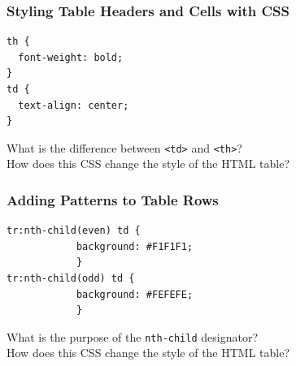 \documentclass[14pt,aspectratio=169]{beamer}
\begin{document}
%
\begin{frame}[fragile]
  \frametitle{Styling Table Headers and Cells with CSS}
  \normalsize
  \hspace*{.25in}
  \begin{minipage}{6in}
    \vspace*{.2in}
    \begin{verbatim}
th {
  font-weight: bold;
}
td {
  text-align: center;
}
    \end{verbatim}
  \end{minipage}
  \vspace*{.05in}
  \begin{center}
    \noindent What is the difference between {\tt <td>} and {\tt <th>}?\\
    \noindent How does this CSS change the style of the HTML table?\\
  \end{center}
\end{frame}

%
\begin{frame}[fragile]
  \frametitle{Adding Patterns to Table Rows}
  \normalsize
  \hspace*{.25in}
  \begin{minipage}{6in}
    \vspace*{.2in}
    \begin{verbatim}
tr:nth-child(even) td {
            background: #F1F1F1;
            }
tr:nth-child(odd) td {
            background: #FEFEFE;
            }
    \end{verbatim}
  \end{minipage}
  \vspace*{.05in}
  \begin{center}
    \noindent What is the purpose of the {\tt nth-child} designator?\\
    \noindent How does this CSS change the style of the HTML table?\\
  \end{center}
\end{frame}
\end{document}
